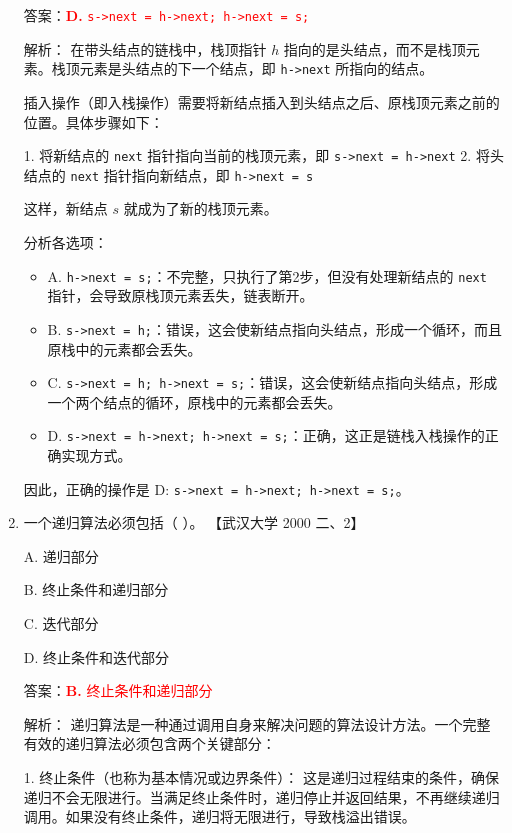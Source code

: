 \documentclass[lang=cn,newtx,10pt,scheme=chinese]{../../../elegantbook}
\begin{document}
\begin{enumerate}
    答案：\textcolor{red}{\textbf{D.} \texttt{s->next = h->next; h->next = s;}}

    解析：
    在带头结点的链栈中，栈顶指针 $h$ 指向的是头结点，而不是栈顶元素。栈顶元素是头结点的下一个结点，即 \texttt{h->next} 所指向的结点。

    插入操作（即入栈操作）需要将新结点插入到头结点之后、原栈顶元素之前的位置。具体步骤如下：

    1. 将新结点的 \texttt{next} 指针指向当前的栈顶元素，即 \texttt{s->next = h->next}
    2. 将头结点的 \texttt{next} 指针指向新结点，即 \texttt{h->next = s}

    这样，新结点 $s$ 就成为了新的栈顶元素。

    分析各选项：
    \begin{itemize}
        \item A. \texttt{h->next = s;}：不完整，只执行了第2步，但没有处理新结点的 \texttt{next} 指针，会导致原栈顶元素丢失，链表断开。
        
        \item B. \texttt{s->next = h;}：错误，这会使新结点指向头结点，形成一个循环，而且原栈中的元素都会丢失。
        
        \item C. \texttt{s->next = h; h->next = s;}：错误，这会使新结点指向头结点，形成一个两个结点的循环，原栈中的元素都会丢失。
        
        \item D. \texttt{s->next = h->next; h->next = s;}：正确，这正是链栈入栈操作的正确实现方式。
    \end{itemize}

    因此，正确的操作是 D: \texttt{s->next = h->next; h->next = s;}。

    \item 一个递归算法必须包括（ ）。  
    【武汉大学 2000 二、2】  

    A. 递归部分  

    B. 终止条件和递归部分  

    C. 迭代部分  

    D. 终止条件和迭代部分  

    答案：\textcolor{red}{\textbf{B.} 终止条件和递归部分}

    解析：
    递归算法是一种通过调用自身来解决问题的算法设计方法。一个完整有效的递归算法必须包含两个关键部分：

    1. 终止条件（也称为基本情况或边界条件）：
       这是递归过程结束的条件，确保递归不会无限进行。当满足终止条件时，递归停止并返回结果，不再继续递归调用。如果没有终止条件，递归将无限进行，导致栈溢出错误。


\end{enumerate}
\end{document}
